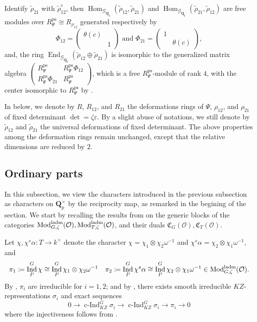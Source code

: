 \documentclass[leqno]{amsart}
\newcommand{\smat}[1]{\left( \begin{smallmatrix} #1 \end{smallmatrix} \right)}
\newcommand{\Gp}{\mathcal{G}_{\Qp}} %
\newcommand{\laMod}{\textnormal{Mod}^{\textnormal{ladm}}}
\DeclareMathOperator{\ps}{ps}
\newcommand{\Qp}{\mathbf{Q}_p}
\newcommand{\oo}{\mathcal O}
\newcommand{\1}{\mathbf{1}}
\newcommand{\fC}{\mathfrak C}
\DeclareMathOperator{\End}{End}
\DeclareMathOperator{\Hom}{Hom}
\DeclareMathOperator{\Ind}{Ind}
\DeclareMathOperator{\cInd}{c-Ind}
\theoremstyle{definition}
\theoremstyle{remark}
\begin{document}
Identify $\tilde{\rho}_{21}$ with $\tilde{\rho}_{12}^c$,
then
$\Hom_{\Gp}(\tilde{\rho}_{12}, \tilde{\rho}_{21})$ and
$\Hom_{\Gp}(\tilde{\rho}_{21}, \tilde{\rho}_{12})$
are free modules over $R_{\Psi}^{\ps}\cong R_{\rho_{12}}$ 
generated respectively by
\begin{equation}\label{eq:Phi_ij}
	\Phi_{12}=\smat{\theta(c)&\\&1} \text{ and }
	\Phi_{21}=\smat{1&\\&\theta(c)},
\end{equation}
and, the ring $\End_{\Gp}(\tilde{\rho}_{12}\oplus \tilde{\rho}_{21})$
is isomorphic to the generalized matrix algebra
$\smat{R_{\Psi}^{\ps}& R_{\Psi}^{\ps}\Phi_{12}\\ R_{\Psi}^{\ps}\Phi_{21}& R_{\Psi}^{\ps}}$,
which is a free $R_{\Psi}^{\ps}$-module of rank  $4$,
with the center isomorphic to  $R_{\Psi}^{\ps}$
by \cite[Prop B.26]{pask}.

In below, we denote by 
$R$,  $R_{12}$, and $R_{21}$
the deformations rings of 
$\Psi$,  $\rho_{12}$, and $\rho_{21}$
of fixed determinant $\det=\zeta\varepsilon$.
By a slight abuse of notations,
we still denote by $\tilde{\rho}_{12}$
and $\tilde{\rho}_{21}$ the universal deformations
of fixed determinant.
The above properties among the deformation rings
remain unchanged,
except that the relative dimensions are reduced by $2$.

\subsection{Ordinary parts}

In this subsection,
we view the characters introduced 
in the previous subsection as characters
on $\Qp^\times$ by the reciprocity map,
as remarked in the begining of the section.
We start by recalling the results from
\cite[\S 7 \S 8]{pask}
on the generic blocks of the categories
$\laMod_{G,\zeta}(\oo), \laMod_{T,\zeta}(\oo)$,
and their duals $\fC_G(\oo), \fC_T(\oo)$.

Let $\chi, \chi^s\alpha\colon T\to k^\times$
denote the character  
$\chi=\chi_1\otimes\chi_2\omega^{-1}$
and  $\chi^s\alpha=\chi_2\otimes \chi_1\omega^{-1}$, and
\[
\pi_1\coloneqq \Ind_{P}^G\chi\cong
\Ind_{P}^G\chi_1\otimes\chi_2\omega^{-1}\quad
\pi_2\coloneqq \Ind_{P}^G\chi^s\alpha\cong 
\Ind_{P}^G\chi_2\otimes\chi_1\omega^{-1} \in \laMod_{G,\zeta}(\oo).
\]
By \cite[Thm 30]{barthel},
$\pi_i$ are irreducible for  $i=1,2$;
and by \cite[Thm 33]{barthel}, there exists
smooth irreducible $KZ$-representations $\sigma_i$
and exact sequences
\begin{equation}
	0\to \cInd_{KZ}^G\sigma_i\to
	\cInd_{KZ}^G\sigma_i\to \pi_i\to 0
\end{equation}
where the injectiveness follows from \cite[Thm 19]{barthel}.
\end{document}
